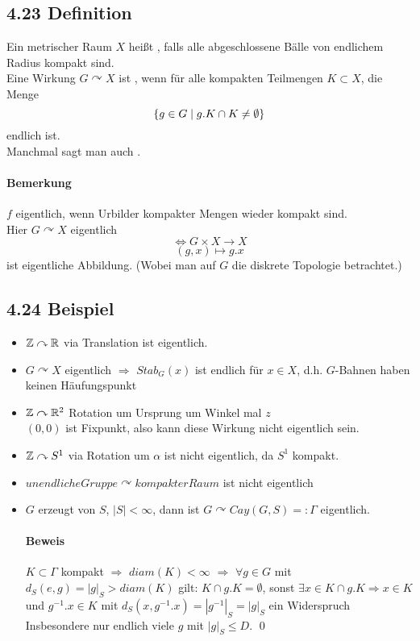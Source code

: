 \documentclass{article}
\begin{document}

\subsection{4.23 Definition}
Ein metrischer Raum $X$ heißt , falls alle abgeschlossene Bälle von endlichem Radius kompakt sind.\\
Eine Wirkung $G\curvearrowright X$ ist , wenn für alle kompakten Teilmengen $K \subset X$, die Menge
\[\set{g\in G}{g.K \cap K \neq \emptyset}\]
endlich ist.\\
Manchmal sagt man auch .

\paragraph{Bemerkung}
$f$ eigentlich, wenn Urbilder kompakter Mengen wieder kompakt sind.\\
Hier $G\curvearrowright X$ eigentlich
\[\Longleftrightarrow G\times X \longrightarrow X \]
\[(g,x) \longmapsto g.x\]
ist eigentliche Abbildung. (Wobei man auf $G$ die diskrete Topologie betrachtet.)

\subsection{4.24 Beispiel}
\begin{itemize}
	\item $\mathbb{Z} \curvearrowright \mathbb{R}$ via Translation ist eigentlich.
	\item $G\curvearrowright X$ eigentlich $\Longrightarrow$ $Stab_G(x)$ ist endlich für $x \in X$, d.h. $G$-Bahnen haben keinen Häufungspunkt
	\item $\mathbb{Z} \curvearrowright \mathbb{R}^2$ Rotation um Ursprung um Winkel mal $z$\\
	$(0,0)$ ist Fixpunkt, also kann diese Wirkung nicht eigentlich sein.
	\item $\mathbb{Z} \curvearrowright S^1$ via Rotation um $\alpha$ ist nicht eigentlich, da $S^1$ kompakt.
	\item $unendliche Gruppe \curvearrowright kompakter Raum$ ist nicht eigentlich
	\item $G$ erzeugt von $S$, $|S| < \infty$, dann ist $G \curvearrowright Cay(G,S) =: \Gamma$ eigentlich.
	\paragraph{Beweis}
	$K \subset \Gamma$ kompakt $\Longrightarrow$ $diam(K)< \infty$ $\Longrightarrow$ $\forall g\in G$ mit $d_S(e,g) = |g|_S > diam(K)$ gilt: $K\cap g.K = \emptyset$, sonst $\exists x \in K \cap g.K \Longrightarrow x \in K$ und $g^{-1}.x\in K$ mit $d_S(x,g^{-1}.x) = |g^{-1}|_S = |g|_S$ ein Widerspruch\\
	Insbesondere nur endlich viele $g$ mit $|g|_S \leq D$. \qed
\end{itemize}
\end{document}
